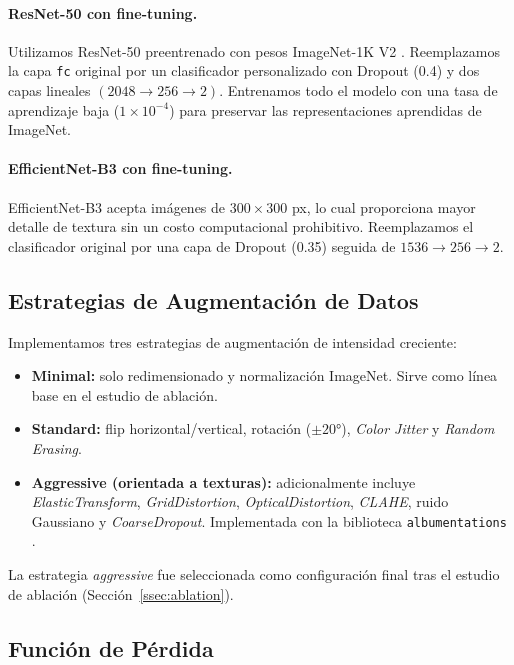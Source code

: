 \documentclass{article}
\begin{document}
\paragraph{ResNet-50 con fine-tuning.}
Utilizamos ResNet-50 preentrenado con pesos ImageNet-1K V2 \cite{he2016deep}. 
Reemplazamos la capa \texttt{fc} original por un clasificador personalizado con 
Dropout (0.4) y dos capas lineales $(2048 \to 256 \to 2)$. Entrenamos todo el 
modelo con una tasa de aprendizaje baja ($1 \times 10^{-4}$) para preservar las 
representaciones aprendidas de ImageNet.

\paragraph{EfficientNet-B3 con fine-tuning.}
EfficientNet-B3 \cite{tan2019efficientnet} acepta imágenes de $300 \times 300$ px, 
lo cual proporciona mayor detalle de textura sin un costo computacional prohibitivo. 
Reemplazamos el clasificador original por una capa de Dropout (0.35) seguida de 
$1536 \to 256 \to 2$.

\subsection{Estrategias de Augmentación de Datos}
\label{ssec:augmentation}

Implementamos tres estrategias de augmentación de intensidad creciente:

\begin{itemize}
  \item \textbf{Minimal:} solo redimensionado y normalización ImageNet. Sirve como línea base en el estudio de ablación.
  \item \textbf{Standard:} flip horizontal/vertical, rotación ($\pm 20°$), \emph{Color Jitter} y \emph{Random Erasing}.
  \item \textbf{Aggressive (orientada a texturas):} adicionalmente incluye \emph{ElasticTransform}, \emph{GridDistortion}, \emph{OpticalDistortion}, \emph{CLAHE}, ruido Gaussiano y \emph{CoarseDropout}. Implementada con la biblioteca \texttt{albumentations} \cite{buslaev2020albumentations}.
\end{itemize}

La estrategia \emph{aggressive} fue seleccionada como configuración final tras el 
estudio de ablación (Sección~\ref{ssec:ablation}).

\subsection{Función de Pérdida}
\label{ssec:loss}
\end{document}
